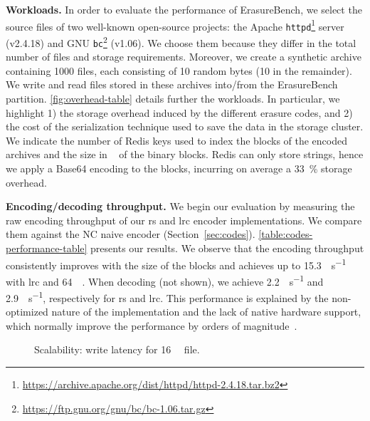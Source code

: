 \textbf{Workloads.}
In order to evaluate the performance of ErasureBench, we select the source files of two well-known open-source projects: the Apache \texttt{httpd}\footnote{\url{https://archive.apache.org/dist/httpd/httpd-2.4.18.tar.bz2}} server (v2.4.18) and GNU \texttt{bc}\footnote{\url{https://ftp.gnu.org/gnu/bc/bc-1.06.tar.gz}} (v1.06). 
We choose them because they differ in the total number of files and storage requirements.
Moreover, we create a synthetic archive containing 1000 files, each consisting of 10 random bytes (\SI{10}{\byte} in the remainder).
We write and read files stored in these archives into/from the ErasureBench partition. 
\autoref{fig:overhead-table} details further the workloads.
In particular, we highlight 1) the storage overhead induced by the different erasure codes, and 2) the cost of the serialization technique used to save the data in the storage cluster.
We indicate the number of Redis keys used to index the blocks of the encoded archives and the size in \si{\mega\byte} of the binary blocks. 
Redis can only store strings, hence we apply a Base64 encoding to the blocks, incurring on average a \SI{33}{\percent} storage overhead.

\textbf{Encoding/decoding throughput.}%
\label{subsec:rw-perf}
We begin our evaluation by measuring the raw encoding throughput of our \ac{rs} and \ac{lrc} encoder implementations.
We compare them against the NC naive encoder (Section~\ref{sec:codes}).
\autoref{table:codes-performance-table} presents our results.  We observe that the encoding throughput consistently improves with the size of the blocks and achieves up to 15.3\si{\mega\byte\per\second} with \ac{lrc} and \SI{64}{\mega\byte}.
When decoding (not shown), we achieve 2.2\si{\mega\byte\per\second} and 2.9\si{\mega\byte\per\second}, respectively for \ac{rs} and \ac{lrc}.
This performance is explained by the non-optimized nature of the implementation and the lack of native hardware support, which normally improve the performance by orders of magnitude~\cite{Burihabwa2016}. 

\begin{figure}[t]
    \centering
    
    \caption{Scalability: write latency for \SI{16}{\mebi\byte} file.}
    \label{fig:latency-plot}
\end{figure}


